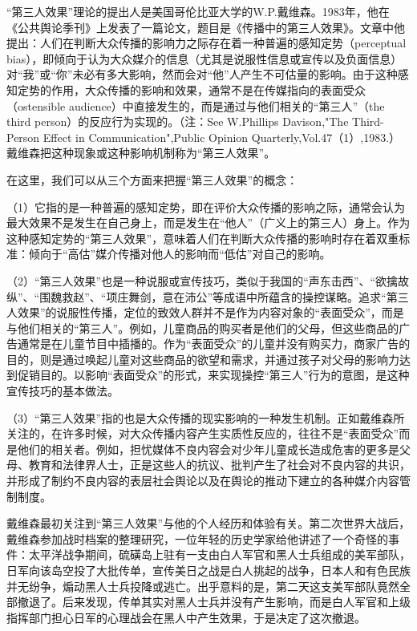 \documentclass[UTF8,12pt]{ctexart}
\numberwithin{equation}{section} %
\numberwithin{figure}{section}
\numberwithin{table}{section}
\begin{document}
	“第三人效果”理论的提出人是美国哥伦比亚大学的W.P.戴维森。1983年，他在《公共舆论季刊》上发表了一篇论文，题目是《传播中的第三人效果》。文章中他提出：人们在判断大众传播的影响力之际存在着一种普遍的感知定势（perceptual bias），即倾向于认为大众媒介的信息（尤其是说服性信息或宣传以及负面信息）对“我”或“你”未必有多大影响，然而会对“他”人产生不可估量的影响。由于这种感知定势的作用，大众传播的影响和效果，通常不是在传媒指向的表面受众（ostensible audience）中直接发生的，而是通过与他们相关的“第三人”（the third person）的反应行为实现的。（注：See W.Phillips Davison,"The Third-Person Effect in Communication",Public Opinion Quarterly,Vol.47（1）,1983.）戴维森把这种现象或这种影响机制称为“第三人效果”。
	
	在这里，我们可以从三个方面来把握“第三人效果”的概念：
	
	（1）它指的是一种普遍的感知定势，即在评价大众传播的影响之际，通常会认为最大效果不是发生在自己身上，而是发生在“他人”（广义上的第三人）身上。作为这种感知定势的“第三人效果”，意味着人们在判断大众传播的影响时存在着双重标准：倾向于“高估”媒介传播对他人的影响而“低估”对自己的影响。
	
	（2）“第三人效果”也是一种说服或宣传技巧，类似于我国的“声东击西”、“欲擒故纵”、“围魏救赵”、“项庄舞剑，意在沛公”等成语中所蕴含的操控谋略。追求“第三人效果”的说服性传播，定位的致效人群并不是作为内容对象的“表面受众”，而是与他们相关的“第三人”。例如，儿童商品的购买者是他们的父母，但这些商品的广告通常是在儿童节目中插播的。作为“表面受众”的儿童并没有购买力，商家广告的目的，则是通过唤起儿童对这些商品的欲望和需求，并通过孩子对父母的影响力达到促销目的。以影响“表面受众”的形式，来实现操控“第三人”行为的意图，是这种宣传技巧的基本做法。
	
	（3）“第三人效果”指的也是大众传播的现实影响的一种发生机制。正如戴维森所关注的，在许多时候，对大众传播内容产生实质性反应的，往往不是“表面受众”而是他们的相关者。例如，担忧媒体不良内容会对少年儿童成长造成危害的更多是父母、教育和法律界人士，正是这些人的抗议、批判产生了社会对不良内容的共识，并形成了制约不良内容的表层社会舆论以及在舆论的推动下建立的各种媒介内容管制制度。
	
	戴维森最初关注到“第三人效果”与他的个人经历和体验有关。第二次世界大战后，戴维森参加战时档案的整理研究，一位年轻的历史学家给他讲述了一个奇怪的事件：太平洋战争期间，硫磺岛上驻有一支由白人军官和黑人士兵组成的美军部队，日军向该岛空投了大批传单，宣传美日之战是白人挑起的战争，日本人和有色民族并无纷争，煽动黑人士兵投降或逃亡。出乎意料的是，第二天这支美军部队竟然全部撤退了。后来发现，传单其实对黑人士兵并没有产生影响，而是白人军官和上级指挥部门担心日军的心理战会在黑人中产生效果，于是决定了这次撤退。
	
\end{document}
